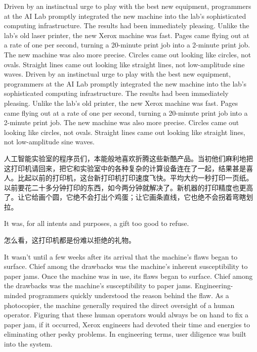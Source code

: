 \ifdefined\eng
\ifdefined\vone
Driven by an instinctual urge to play with the best new equipment, programmers at the AI Lab promptly integrated the new machine into the lab's sophisticated computing infrastructure. The results had been immediately pleasing. Unlike the lab's old laser printer, the new Xerox machine was fast. Pages came flying out at a rate of one per second, turning a 20-minute print job into a 2-minute print job. The new machine was also more precise. Circles came out looking like circles, not ovals. Straight lines came out looking like straight lines, not low-amplitude sine waves.
\fi
\ifdefined\vtwo
Driven by an instinctual urge to play with the best new equipment, programmers at the AI Lab promptly integrated the new machine into the lab's sophisticated computing infrastructure. The results had been immediately pleasing. Unlike the lab's old printer, the new Xerox machine was fast. Pages came flying out at a rate of one per second, turning a 20-minute print job into a 2-minute print job. The new machine was also more precise. Circles came out looking like circles, not ovals. Straight lines came out looking like straight lines, not low-amplitude sine waves.
\fi
\fi

\ifdefined\chs
人工智能实验室的程序员们，本能般地喜欢折腾这些新酷产品。当初他们麻利地把这打印机请回来，把它和实验室中的各种复杂的计算设备连在了一起，结果甚是喜人。比起以前的打印机，这台新打印机打印速度飞快。平均大约一秒打印一页纸。以前要花二十多分钟打印的东西，如今两分钟就解决了。新机器的打印精度也更高了。让它给画个圆，它绝不会打出个鸡蛋；让它画条直线，它也绝不会拐着弯瞎划拉。
\fi

\ifdefined\eng
It was, for all intents and purposes, a gift too good to refuse.
\fi

\ifdefined\chs
怎么看，这打印机都是份难以拒绝的礼物。
\fi

\ifdefined\eng
\ifdefined\vone
It wasn't until a few weeks after its arrival that the machine's flaws began to surface. Chief among the drawbacks was the machine's inherent susceptibility to paper jams.
\fi
\ifdefined\vtwo
Once the machine was in use, its flaws began to surface. Chief among the drawbacks was the machine's susceptibility to paper jams.
\fi
Engineering-minded programmers quickly understood the reason behind the flaw. As a photocopier, the machine generally required the direct oversight of a human operator. Figuring that these human operators would always be on hand to fix a paper jam, if it occurred, Xerox engineers had devoted their time and energies to eliminating other pesky problems. In engineering terms, user diligence was built into the system.
\fi

